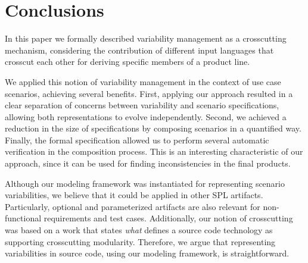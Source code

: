 \documentclass{acm_proc_article-sp}
\begin{document}
\section{Conclusions}\label{sec:conclusions}

In this paper we formally described variability management as a 
crosscutting mechanism, considering the contribution 
of different input languages that crosscut each other for deriving 
specific members of a product line. 

We applied this notion of variability management in the context of use 
case scenarios, achieving several benefits. First, applying our approach resulted in 
a clear separation of concerns between variability and scenario specifications, 
allowing both representations to evolve independently. Second, we achieved a reduction 
in the size of specifications by composing scenarios in a quantified way. Finally, the 
formal specification allowed us to perform several automatic verification in the composition 
process. This is an interesting characteristic of our approach, since it can be used 
for finding inconsistencies in the final products.

Although our modeling framework was instantiated for representing 
scenario variabilities, we believe that it could be applied in 
other SPL artifacts. Particularly, optional and parameterized artifacts 
are also relevant for non-functional requirements and test cases. 
Additionally, our notion of crosscutting was based on a work that states \emph{what} 
defines a source code technology as supporting crosscutting modularity. Therefore, 
we argue that representing variabilities in source code, using our modeling framework, 
is straightforward.   


%
%



\end{document}
